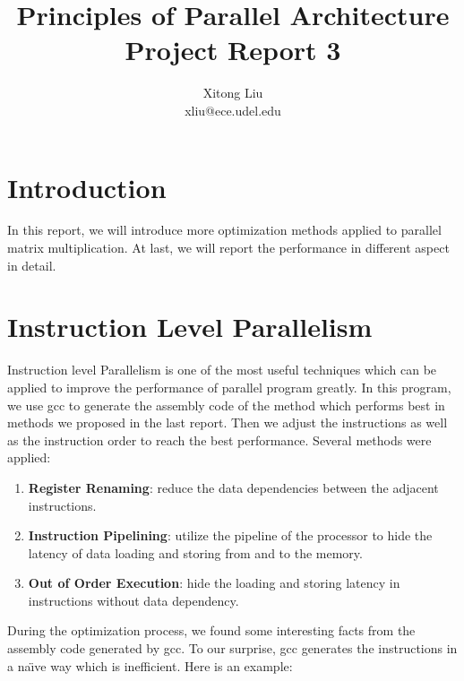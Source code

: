 \documentclass[12pt]{article}
\title{Principles of Parallel Architecture\\
Project Report 3}
\author{Xitong Liu \\
xliu@ece.udel.edu}
\begin{document}
\maketitle

\section{Introduction}
In this report, we will introduce more optimization methods applied
to parallel matrix multiplication. At last, we will report the 
performance in different aspect in detail.

\section{Instruction Level Parallelism}
Instruction level Parallelism is one of the most useful techniques which
can be applied to improve the performance of parallel program greatly.
In this program, we use gcc to generate the assembly code of the method
which performs best in methods we proposed in the last report. Then we
adjust the instructions as well as the instruction order to reach the
best performance. Several methods were applied:

\begin{enumerate}
\item \textbf{Register Renaming}: reduce the data dependencies between 
the adjacent instructions.
\item \textbf{Instruction Pipelining}: utilize the pipeline of the 
processor to hide the latency of data loading and storing from and to 
the memory.
\item \textbf{Out of Order Execution}: hide the loading and storing 
latency in instructions without data dependency.
\end{enumerate}

During the optimization process, we found some interesting facts from
the assembly code generated by gcc. To our surprise, gcc generates the
instructions in a na\"\i ve way which is inefficient. Here is an example:
\end{document}
